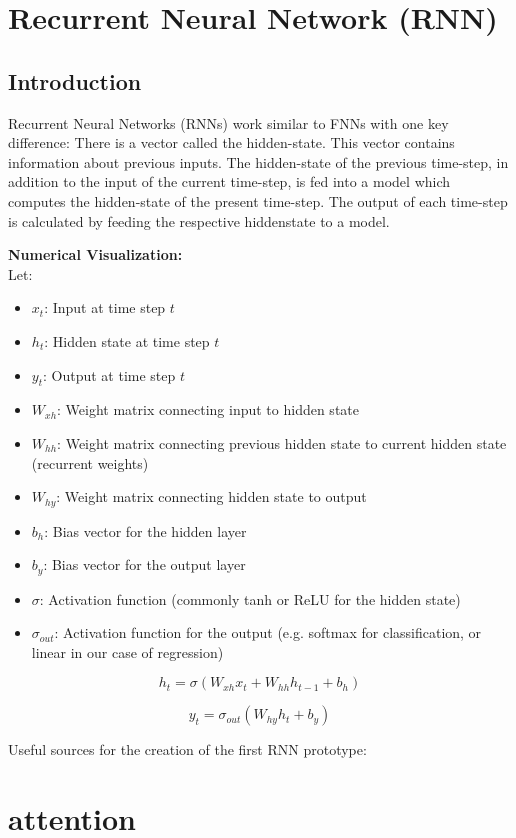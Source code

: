 \documentclass{article}
\begin{document}
\section{Recurrent Neural Network (RNN)}
\subsection{Introduction}
Recurrent Neural Networks (RNNs) work similar to FNNs with one key 
difference: There is a vector called the hidden-state. This vector contains 
information about previous inputs. The hidden-state of the previous 
time-step, in addition to the input of the current time-step, is fed into a 
model which computes the hidden-state of the present time-step. The output 
of each time-step is calculated by feeding the respective hiddenstate to a 
model.

\newpage
\textbf{ Numerical Visualization:}
\\

Let:
\begin{itemize}
    \item $x_t$: Input at time step $t$
    \item $h_t$: Hidden state at time step $t$
    \item $y_t$: Output at time step $t$
    \item $W_{xh}$: Weight matrix connecting input to hidden state
    \item $W_{hh}$: Weight matrix connecting previous hidden state to current hidden state (recurrent weights)
    \item $W_{hy}$: Weight matrix connecting hidden state to output
    \item $b_h$: Bias vector for the hidden layer
    \item $b_y$: Bias vector for the output layer
    \item $\sigma$: Activation function (commonly tanh or ReLU for the hidden state)
    \item $\sigma_{out}$: Activation function for the output (e.g. softmax for classification, or linear in our case of regression)
\end{itemize}



$$h_t = \sigma(W_{xh}x_t + W_{hh}h_{t-1} + b_h)$$

$$y_t = \sigma_{out}(W_{hy}h_t + b_y)$$



Useful sources for the creation of the first RNN prototype:
\newpage

\section{attention}

\end{document}
